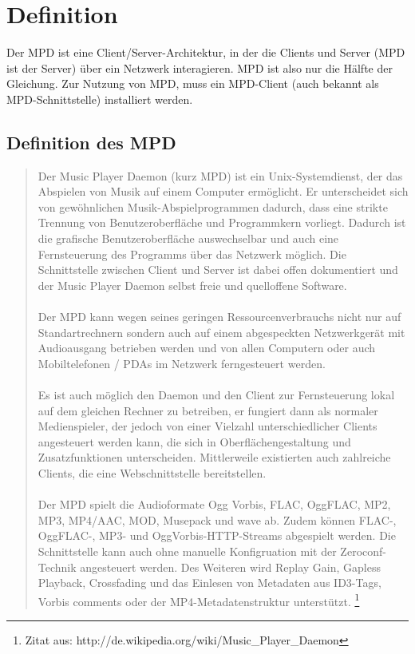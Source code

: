 \chapter{Definition}
Der MPD ist eine Client/Server-Architektur, in der die Clients und Server (MPD ist der Server)
über ein Netzwerk interagieren. MPD ist also nur die Hälfte der Gleichung. Zur Nutzung von 
MPD, muss ein MPD-Client (auch bekannt als MPD-Schnittstelle) installiert werden.
\section{Definition des MPD}
\begin{quote}
    Der Music Player Daemon (kurz MPD) ist ein Unix-Systemdienst, der das Abspielen von Musik auf 
    einem Computer ermöglicht. Er unterscheidet sich von gewöhnlichen Musik-Abspielprogrammen dadurch, 
    dass eine strikte Trennung von Benutzeroberfläche und Programmkern vorliegt. Dadurch ist die 
    grafische Benutzeroberfläche auswechselbar und auch eine Fernsteuerung des Programms über das 
    Netzwerk möglich. Die Schnittstelle zwischen Client und Server ist dabei offen dokumentiert und 
    der Music Player Daemon selbst freie und quelloffene Software.\ \\ \\
    Der MPD kann wegen seines geringen Ressourcenverbrauchs nicht nur auf Standartrechnern sondern 
    auch auf einem abgespeckten Netzwerkgerät mit Audioausgang betrieben werden und von allen Computern
    oder auch Mobiltelefonen / PDAs im Netzwerk ferngesteuert werden.\ \\ \\
    Es ist auch möglich den Daemon und den Client zur Fernsteuerung lokal auf dem gleichen Rechner
    zu betreiben, er fungiert dann als normaler Medienspieler, der jedoch von einer Vielzahl 
    unterschiedlicher Clients angesteuert werden kann, die sich in Oberflächengestaltung und Zusatzfunktionen
    unterscheiden. Mittlerweile existierten auch zahlreiche Clients, die eine Webschnittstelle bereitstellen.\ \\ \\
    Der MPD spielt die Audioformate Ogg Vorbis, FLAC, OggFLAC, MP2, MP3, MP4/AAC, MOD, Musepack und wave ab.
    Zudem können FLAC-, OggFLAC-, MP3- und OggVorbis-HTTP-Streams abgespielt werden. Die Schnittstelle kann
    auch ohne manuelle Konfigruation mit der Zeroconf-Technik angesteuert werden. Des Weiteren wird Replay
    Gain, Gapless Playback, Crossfading und das Einlesen von Metadaten aus ID3-Tags, Vorbis comments oder
    der MP4-Metadatenstruktur unterstützt.
    \footnote{Zitat aus: http://de.wikipedia.org/wiki/Music\_Player\_Daemon}
\end{quote}
\newpage
